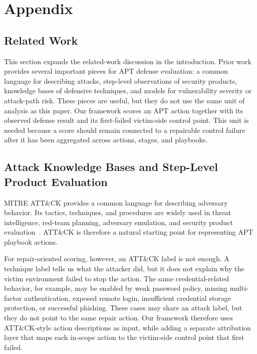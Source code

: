 \section{Appendix}

\subsection{Related Work}
\label{app:related-work}

This section expands the related-work discussion in the introduction. Prior work provides several important pieces for APT defense evaluation: a common language for describing attacks, step-level observations of security products, knowledge bases of defensive techniques, and models for vulnerability severity or attack-path risk. These pieces are useful, but they do not use the same unit of analysis as this paper. Our framework scores an APT action together with its observed defense result and its first-failed victim-side control point. This unit is needed because a score should remain connected to a repairable control failure after it has been aggregated across actions, stages, and playbooks.

\subsection{Attack Knowledge Bases and Step-Level Product Evaluation}

MITRE ATT\&CK provides a common language for describing adversary behavior. Its tactics, techniques, and procedures are widely used in threat intelligence, red-team planning, adversary emulation, and security product evaluation~\cite{mitreAttack}. ATT\&CK is therefore a natural starting point for representing APT playbook actions.

For repair-oriented scoring, however, an ATT\&CK label is not enough. A technique label tells us what the attacker did, but it does not explain why the victim environment failed to stop the action. The same credential-related behavior, for example, may be enabled by weak password policy, missing multi-factor authentication, exposed remote login, insufficient credential storage protection, or successful phishing. These cases may share an attack label, but they do not point to the same repair action. Our framework therefore uses ATT\&CK-style action descriptions as input, while adding a separate attribution layer that maps each in-scope action to the victim-side control point that first failed.

